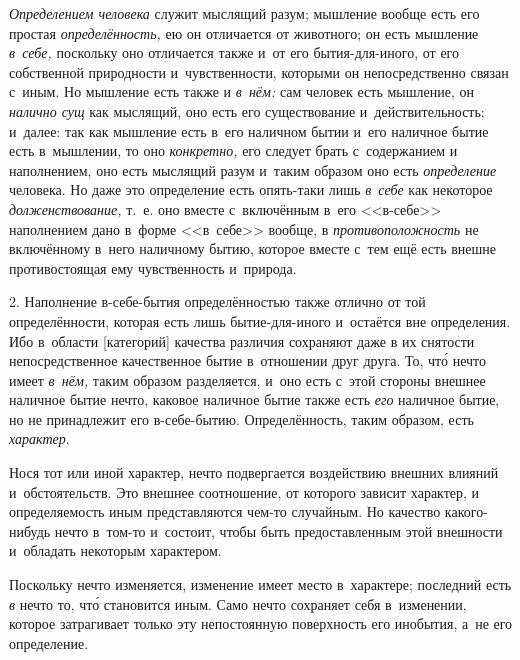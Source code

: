{\em Определением человека} служит мыслящий разум;
мышление вообще есть его простая {\em определённость,}
ею он отличается от животного; он есть мышление {\em в~себе,}
поскольку оно отличается также и~от его бытия-для-иного, от его
собственной природности и~чувственности, которыми он непосредственно связан
с~иным. Но мышление есть также и {\em в~нём:} сам
человек есть мышление, он {\em налично сущ} как
мыслящий, оно есть его существование и~действительность; и~далее: так как
мышление есть в~его наличном бытии и~его наличное бытие есть в~мышлении, то
оно {\em конкретно,} его следует брать с~содержанием и
наполнением, оно есть мыслящий разум и~таким образом оно есть
{\em определение} человека. Но даже это определение
есть опять-таки лишь {\em в~себе} как некоторое
{\em долженствование,} т.~е. оно вместе с~включённым
в~его <<в-себе>> наполнением дано в~форме <<в~себе>>
вообще, в {\em противоположность} не включённому
в~него наличному бытию, которое вместе с~тем ещё
есть внешне противостоящая ему чувственность и~природа.

2. Наполнение в-себе-бытия определённостью также отлично от той
определённости, которая есть лишь бытие-для-иного и~остаётся вне
определения. Ибо в~области [категорий] качества различия сохраняют даже в
их снятости непосредственное качественное бытие в~отношении друг друга. То,
чт\'{о} нечто имеет {\em в~нём,} таким образом разделяется,
и~оно есть с~этой стороны внешнее наличное бытие нечто, каковое наличное
бытие также есть {\em его} наличное бытие, но не
принадлежит его в-себе-бытию. Определённость, таким образом, есть
{\em характер}.

Нося тот или иной характер, нечто подвергается воздействию внешних влияний
и~обстоятельств. Это внешнее соотношение, от которого зависит характер, и
определяемость иным представляются чем-то случайным. Но
качество какого-нибудь нечто в~том-то и~состоит, чтобы быть предоставленным
этой внешности и~обладать некоторым характером.

Поскольку нечто изменяется, изменение имеет место в~характере; последний
есть {\em в} нечто то, чт\'{о} становится иным.
Само нечто сохраняет себя в~изменении, которое затрагивает только эту
непостоянную поверхность его инобытия, а~не его определение.

